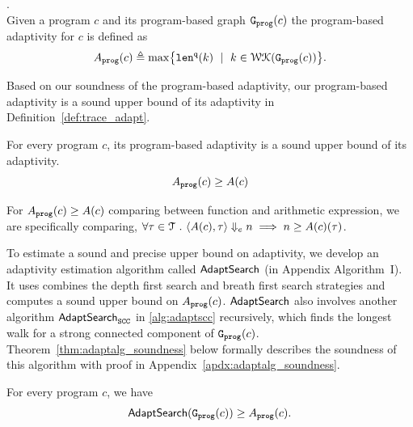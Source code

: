 %
%
\begin{defn}
.
\label{def:prog_adapt}
\\
{
Given a program ${c}$ and its program-based graph 
$\mathtt{{G_{prog}}}({c})$
%
the program-based adaptivity for $c$ is 
defined as%
\[
\progA({c})
\triangleq \max
\left\{ \qlen(k) \ \mid \  k \in \walks(\progG(c))\right \}.
\]
}
\end{defn}
Based on our soundness of the program-based adaptivity, our program-based adaptivity is a sound upper bound of its adaptivity in Definition~\ref{def:trace_adapt}. 
\begin{thm}
    \label{thm:sound_progadapt}
    For every program $c$, 
    its program-based adaptivity is a sound upper bound of its adaptivity.
     $$  A_{\mathtt{prog}}(c) \geq A(c)$$
\end{thm}
For $A_{\mathtt{prog}}(c) \geq A(c)$ comparing between function and arithmetic expression,
we are specifically comparing, $\forall \mathtt{\tau} \in \mathcal{T} ~.~ 
\langle A(c), \mathtt{\tau} \rangle \Downarrow_e n \implies n \geq A(c)(\mathtt{\tau}) $.

To estimate a sound and precise upper bound on adaptivity, we develop an adaptivity estimation algorithm called $\mathsf{AdaptSearch}$ (in Appendix Algorithm~I).
It uses combines the depth first search and breath first search strategies and computes a sound upper bound on $A_{\mathtt{prog}}(c)$.
$\mathsf{AdaptSearch}$ also involves another algorithm $\mathsf{AdaptSearch}_{\mathtt{SCC}}$ in \ref{alg:adaptscc} recursively, which finds the longest walk for a strong connected component of $\mathtt{{G_{prog}}}(c)$.
Theorem~\ref{thm:adaptalg_soundness} below formally describes the soundness of this algorithm with proof in Appendix~\ref{apdx:adaptalg_soundness}.
\begin{thm}
    \label{thm:adaptalg_soundness}
    For every program $c$, we have
     $$\mathsf{AdaptSearch}(\mathtt{{G_{prog}}}({c})) \geq A_{\mathtt{prog}}(c).$$
\end{thm}

